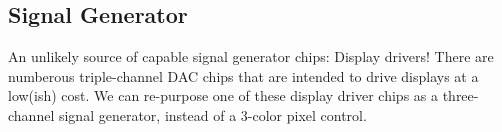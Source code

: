 \subsection{Signal Generator}
	An unlikely source of capable signal generator chips: Display drivers! There are numberous triple-channel DAC chips that are intended to drive displays at a low(ish) cost. We can re-purpose one of these display driver chips as a three-channel signal generator, instead of a 3-color pixel control.